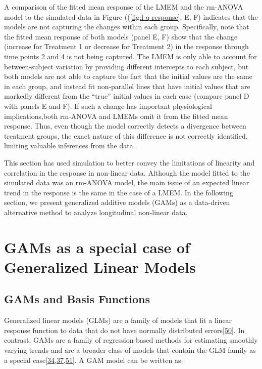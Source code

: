 \documentclass[
]{article}
\begin{document}
A comparison of the fitted mean response of the LMEM and the rm-ANOVA model to the simulated data in Figure ((\ref{fig:l-q-response}, E, F) indicates that the models are not capturing the changes within each group. Specifically, note that the fitted mean response of both models (panel E, F) show that the change (increase for Treatment 1 or decrease for Treatment 2) in the response through time points 2 and 4 is not being captured. The LMEM is only able to account for between-subject variation by providing different intercepts to each subject, but both models are not able to capture the fact that the initial values are the same in each group, and instead fit non-parallel lines that have initial values that are markedly different from the ``true'' initial values in each case (compare panel D with panels E and F). If such a change has important physiological implications,both rm-ANOVA and LMEMs omit it from the fitted mean response. Thus, even though the model correctly detects a divergence between treatment groups, the exact nature of this difference is not correctly identified, limiting valuable inferences from the data.

This section has used simulation to better convey the limitations of linearity and correlation in the response in non-linear data. Although the model fitted to the simulated data was an rm-ANOVA model, the main issue of an expected linear trend in the response is the same in the case of a LMEM. In the following section, we present generalized additive models (GAMs) as a data-driven alternative method to analyze longitudinal non-linear data.

\FloatBarrier

\hypertarget{GAM-theory}{%
\section{GAMs as a special case of Generalized Linear Models}\label{GAM-theory}}

\hypertarget{gams-and-basis-functions}{%
\subsection{GAMs and Basis Functions}\label{gams-and-basis-functions}}

Generalized linear models (GLMs) are a family of models that fit a linear response function to data that do not have normally distributed errors{[}\protect\hyperlink{ref-nelder1972}{50}{]}. In contrast, GAMs are a family of regression-based methods for estimating smoothly varying trends and are a broader class of models that contain the GLM family as a special case{[}\protect\hyperlink{ref-simpson2018}{34},\protect\hyperlink{ref-wood2017}{37},\protect\hyperlink{ref-hastie1987}{51}{]}. A GAM model can be written as:
\end{document}
